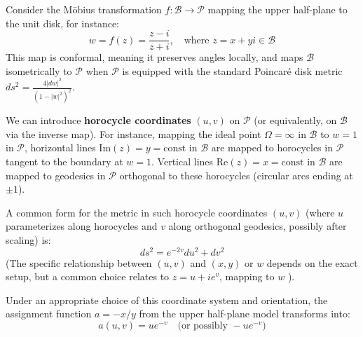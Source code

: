 \documentclass[12pt]{article}
\begin{document}
Consider the Möbius transformation \( f: \mathcal{B} \to \mathcal{P} \) mapping the upper half-plane to the unit disk, for instance:
\[
w = f(z) = \frac{z - i}{z + i}, \quad \text{where } z = x + yi \in \mathcal{B}
\]
This map is conformal, meaning it preserves angles locally, and maps \( \mathcal{B} \) isometrically to \( \mathcal{P} \) when \( \mathcal{P} \) is equipped with the standard Poincaré disk metric \( ds^2 = \frac{4 |dw|^2}{(1-|w|^2)^2} \).

We can introduce \textbf{horocycle coordinates} \( (u, v) \) on \( \mathcal{P} \) (or equivalently, on \( \mathcal{B} \) via the inverse map). For instance, mapping the ideal point \( \Omega = \infty \) in \( \mathcal{B} \) to \( w = 1 \) in \( \mathcal{P} \), horizontal lines \( \text{Im}(z) = y = \text{const} \) in \( \mathcal{B} \) are mapped to horocycles in \( \mathcal{P} \) tangent to the boundary at \( w = 1 \). Vertical lines \( \text{Re}(z) = x = \text{const} \) in \( \mathcal{B} \) are mapped to geodesics in \( \mathcal{P} \) orthogonal to these horocycles (circular arcs ending at \( \pm 1 \)).

A common form for the metric in such horocycle coordinates \( (u, v) \) (where \( u \) parameterizes along horocycles and \( v \) along orthogonal geodesics, possibly after scaling) is:
\begin{equation}
ds^2 = e^{-2v} du^2 + dv^2 \label{eq:metric_horocycle_cs}
\end{equation}
(The specific relationship between \( (u, v) \) and \( (x, y) \) or \( w \) depends on the exact setup, but a common choice relates to \( z = u + ie^v \), mapping to \( w \) ).

Under an appropriate choice of this coordinate system and orientation, the assignment function \( a = -x/y \) from the upper half-plane model transforms into:
\begin{equation}\label{eq:assignment_horocycle_cs}
a(u, v) = u e^{-v} \quad \text{(or possibly } -u e^{-v} \text{)}
\end{equation}
\end{document}
